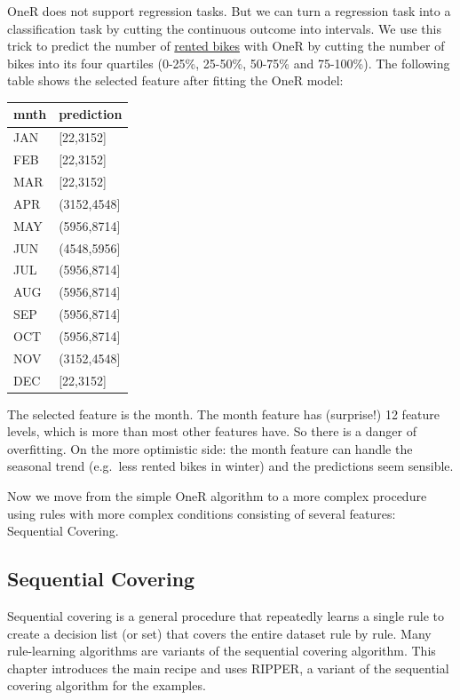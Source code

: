 \documentclass[
  11pt,
]{scrbook}
\begin{document}
OneR does not support regression tasks.
But we can turn a regression task into a classification task by cutting the continuous outcome into intervals.
We use this trick to predict the number of \protect\hyperlink{bike-data}{rented bikes} with OneR by cutting the number of bikes into its four quartiles (0-25\%, 25-50\%, 50-75\% and 75-100\%).
The following table shows the selected feature after fitting the OneR model:

\begin{table}
\centering
\begin{tabular}{ll}
\toprule
mnth & prediction\\
\midrule
JAN & {}[22,3152]\\
FEB & {}[22,3152]\\
MAR & {}[22,3152]\\
APR & (3152,4548]\\
MAY & (5956,8714]\\
\addlinespace
JUN & (4548,5956]\\
JUL & (5956,8714]\\
AUG & (5956,8714]\\
SEP & (5956,8714]\\
OCT & (5956,8714]\\
\addlinespace
NOV & (3152,4548]\\
DEC & {}[22,3152]\\
\bottomrule
\end{tabular}
\end{table}

The selected feature is the month.
The month feature has (surprise!) 12 feature levels, which is more than most other features have.
So there is a danger of overfitting.
On the more optimistic side: the month feature can handle the seasonal trend (e.g.~less rented bikes in winter) and the predictions seem sensible.

Now we move from the simple OneR algorithm to a more complex procedure using rules with more complex conditions consisting of several features: Sequential Covering.

\hypertarget{sequential-covering}{%
\subsection{Sequential Covering}\label{sequential-covering}}

Sequential covering is a general procedure that repeatedly learns a single rule to create a decision list (or set) that covers the entire dataset rule by rule.
Many rule-learning algorithms are variants of the sequential covering algorithm.
This chapter introduces the main recipe and uses RIPPER, a variant of the sequential covering algorithm for the examples.
\end{document}
